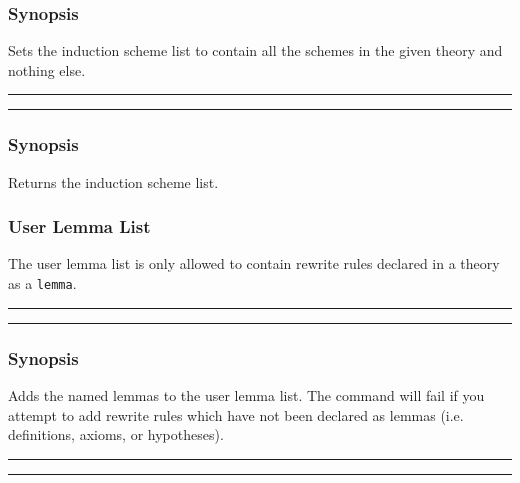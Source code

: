 
\subsubsection*{Synopsis}
Sets the induction scheme list to contain all the schemes in the given 
theory and nothing else.

\vspace{2mm}
\hrule
\vspace{2mm}
\begin{Large}
\end{Large}
\vspace{2mm}
\hrule
\vspace{2mm}


\subsubsection*{Synopsis}
Returns the induction scheme list.

\subsubsection{User Lemma List}
The user lemma list is only allowed to contain rewrite rules declared
in a theory as a \texttt{lemma}.

\vspace{2mm}
\hrule
\vspace{2mm}
\begin{Large}
\end{Large}
\vspace{2mm}
\hrule
\vspace{2mm}


\subsubsection*{Synopsis}
Adds the named lemmas to the user lemma list.  The command will fail
if you attempt to add rewrite rules which have not been declared as
lemmas (i.e. definitions, axioms, or hypotheses).

\vspace{2mm}
\hrule
\vspace{2mm}
\begin{Large}
\end{Large}
\vspace{2mm}
\hrule
\vspace{2mm}

